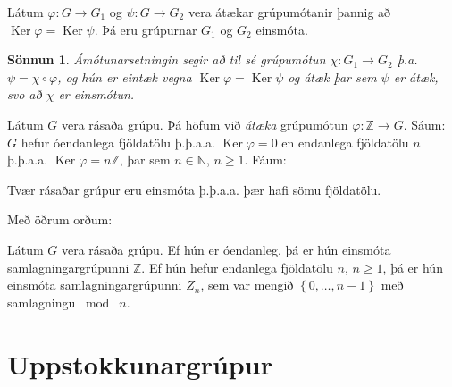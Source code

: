\documentclass[a4paper,icelandic,11pt]{book}
\theoremstyle{plain}
\newtheorem*{sonnun}{Sönnun}
\newcommand{\N}{\mathbb{N}}
\newcommand{\Z}{\mathbb{Z}}
\DeclareMathOperator{\Ker}{Ker} %
\begin{document}
\begin{fylgisetn}
  Látum $\varphi:G\to G_1$ og $\psi:G\to G_2$ vera átækar grúpumótanir þannig að
  $\Ker\varphi = \Ker\psi$. Þá eru grúpurnar $G_1$ og $G_2$ einsmóta.
\end{fylgisetn}
\begin{sonnun}
  Ámótunarsetningin segir að til sé grúpumótun $\chi:G_1\to G_2$ þ.a. $\psi =
  \chi\circ\varphi$, og hún er eintæk vegna $\Ker\varphi=\Ker\psi$ og átæk þar
  sem $\psi$ er átæk, svo að $\chi$ er einsmótun.
\end{sonnun}
Látum $G$ vera rásaða grúpu. Þá höfum við \emph{átæka} grúpumótun $\varphi:\Z\to
G$. Sáum: $G$ hefur óendanlega fjöldatölu þ.þ.a.a. $\Ker\varphi = 0$ en
endanlega fjöldatölu $n$ þ.þ.a.a. $\Ker\varphi = n\Z$, þar sem $n\in\N$,
$n\ge 1$. Fáum:
\begin{fylgisetn}
  Tvær rásaðar grúpur eru einsmóta þ.þ.a.a. þær hafi sömu fjöldatölu.
\end{fylgisetn}
Með öðrum orðum:
\begin{fylgisetn}
  Látum $G$ vera rásaða grúpu. Ef hún er óendanleg, þá er hún einsmóta
  samlagningargrúpunni $\Z$. Ef hún hefur endanlega fjöldatölu $n$, $n\ge 1$,
  þá er hún einsmóta samlagningargrúpunni $Z_n$, sem var mengið $\left\{
  0,\dots,n-1 \right\}$ með samlagningu $\bmod\;n$.
\end{fylgisetn}

\chapter{Uppstokkunargrúpur}
\end{document}
